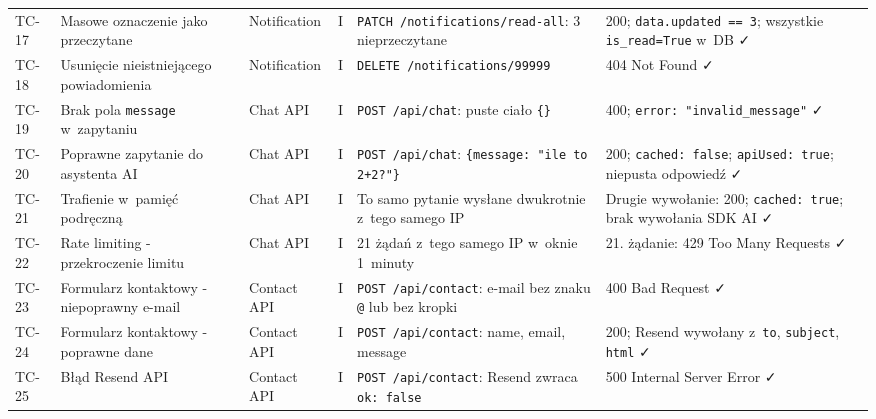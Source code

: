 \documentclass[12pt,a4paper]{article}
\begin{document}
\begin{longtable}{p{1cm} p{3cm} p{1.4cm} p{0.7cm} p{4.5cm} p{4.5cm}}
TC-17 & Masowe oznaczenie jako przeczytane & Notification & I &
  \texttt{PATCH /notifications/read-all}: 3 nieprzeczytane &
  200; \texttt{data.updated == 3}; wszystkie \texttt{is\_read=True} w~DB \faCheck \\
\addlinespace

TC-18 & Usunięcie nieistniejącego powiadomienia & Notification & I &
  \texttt{DELETE /notifications/99999} &
  404 Not Found \faCheck \\
\addlinespace

\midrule

TC-19 & Brak pola \texttt{message} w~zapytaniu & Chat API & I &
  \texttt{POST /api/chat}: puste ciało \texttt{\{\}} &
  400; \texttt{error: "invalid\_message"} \faCheck \\
\addlinespace

TC-20 & Poprawne zapytanie do asystenta AI & Chat API & I &
  \texttt{POST /api/chat}: \texttt{\{message: "ile to 2+2?"\}} &
  200; \texttt{cached: false}; \texttt{apiUsed: true}; niepusta odpowiedź \faCheck \\
\addlinespace

TC-21 & Trafienie w~pamięć podręczną & Chat API & I &
  To samo pytanie wysłane dwukrotnie z~tego samego IP &
  Drugie wywołanie: 200; \texttt{cached: true}; brak wywołania SDK AI \faCheck \\
\addlinespace

TC-22 & Rate limiting - przekroczenie limitu & Chat API & I &
  21 żądań z~tego samego IP w~oknie 1~minuty &
  21. żądanie: 429 Too Many Requests \faCheck \\
\addlinespace

\midrule

TC-23 & Formularz kontaktowy - niepoprawny e-mail & Contact API & I &
  \texttt{POST /api/contact}: e-mail bez znaku \texttt{@} lub bez kropki &
  400 Bad Request \faCheck \\
\addlinespace

TC-24 & Formularz kontaktowy - poprawne dane & Contact API & I &
  \texttt{POST /api/contact}: name, email, message &
  200; Resend wywołany z~\texttt{to}, \texttt{subject}, \texttt{html} \faCheck \\
\addlinespace

TC-25 & Błąd Resend API & Contact API & I &
  \texttt{POST /api/contact}: Resend zwraca \texttt{ok: false} &
  500 Internal Server Error \faCheck \\

\end{longtable}
\endgroup
\end{document}
